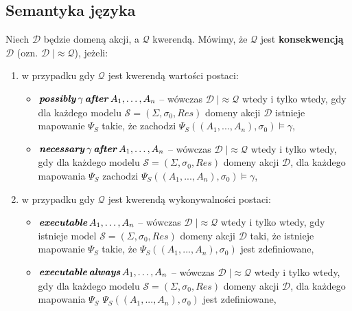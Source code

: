 \documentclass[11pt,a4paper]{article}
\DeclareMathOperator{\After}{\textbf{\textit{after}}}
\DeclareMathOperator{\Always}{\textbf{\textit{always}}}
\DeclareMathOperator{\Executable}{\textbf{\textit{executable}}}
\DeclareMathOperator{\Possibly}{\textbf{\textit{possibly}}}
\DeclareMathOperator{\Necessary}{\textbf{\textit{necessary}}}
\begin{document}
\subsection{Semantyka języka}

    Niech $\mathcal{D}$ będzie domeną akcji, a $\mathcal{Q}$ kwerendą. %
    Mówimy, że $\mathcal{Q}$ jest \textbf{konsekwencją} $\mathcal{D}$ (ozn. $\mathcal{D} \; |\!\!\!\approx \mathcal{Q}$), jeżeli:

    \begin{enumerate}
        \item w przypadku gdy $\mathcal{Q}$ jest kwerendą wartości postaci:
        \begin{itemize}
            \item $\Possibly \gamma \After A_1, \dots, A_n$ -- wówczas $\mathcal{D} \; |\!\!\!\approx \mathcal{Q}$ wtedy i tylko wtedy, gdy dla każdego modelu %
            $\mathcal{S} = (\Sigma,\sigma_0,Res)$ domeny akcji $\mathcal{D}$ istnieje mapowanie $\Psi_S$ takie, że zachodzi $\Psi_S((A_1,...,A_n),\sigma_{0}) \models \gamma$,
            \item $\Necessary \gamma \After A_1, \dots, A_n$ -- wówczas $\mathcal{D} \; |\!\!\!\approx \mathcal{Q}$ wtedy i tylko wtedy, gdy dla każdego modelu %
            $\mathcal{S} = (\Sigma,\sigma_0,Res)$ domeny akcji $\mathcal{D}$, dla każdego mapowania $\Psi_S$ zachodzi $\Psi_S((A_1,...,A_n),\sigma_{0}) \models \gamma$,
        \end{itemize}
        \item w przypadku gdy $\mathcal{Q}$ jest kwerendą wykonywalności postaci:
        \begin{itemize}
            \item $\Executable A_1, \dots, A_n$ -- wówczas $\mathcal{D} \; |\!\!\!\!\approx \mathcal{Q}$ wtedy i tylko wtedy, gdy istnieje model %
            $\mathcal{S} = (\Sigma,\sigma_0,Res)$ domeny akcji $\mathcal{D}$ taki, że istnieje %
            mapowanie $\Psi_S$ takie, że $\Psi_S((A_1,...,A_n),\sigma_{0})$ jest zdefiniowane,
            \item $\Executable \Always A_1, \dots, A_n$ -- wówczas $\mathcal{D} \; |\!\!\!\!\!\approx \mathcal{Q}$ wtedy i tylko wtedy, gdy dla każdego modelu %
            $\mathcal{S} = (\Sigma,\sigma_0,Res)$ domeny akcji $\mathcal{D}$, dla każdego mapowania $\Psi_S$ $\Psi_S((A_1,...,A_n),\sigma_{0})$ jest zdefiniowane,
        \end{itemize}

\end{enumerate}
\end{document}
